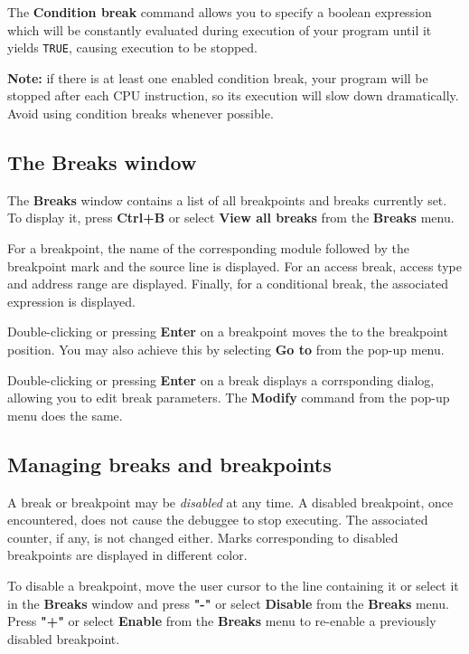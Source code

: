 The {\bf Condition break} command allows you to specify a
boolean expression which will be constantly evaluated during
execution of your program until it yields \verb'TRUE', causing
execution to be stopped.

{\bf Note:} if there is at least one enabled condition break, your program
will be stopped after each CPU instruction, so its execution will slow
down dramatically. Avoid using condition breaks whenever possible.

\subsection{The Breaks window}
\label{dialog:breaks:window}

The {\bf Breaks} window contains a list of all breakpoints and breaks
currently set. To display it, press {\bf Ctrl+B} or select
{\bf View all breaks} from the {\bf Breaks} menu.

For a breakpoint, the name of the corresponding module
followed by the breakpoint mark and the source line is displayed.
For an access break, access type and address range are displayed.
Finally, for a conditional break, the associated expression is displayed.

Double-clicking or pressing {\bf Enter} on a breakpoint moves
the  to the
breakpoint position. You may also achieve this by selecting {\bf Go to}
from the pop-up menu.

Double-clicking or pressing {\bf Enter} on a break displays a
corrsponding dialog, allowing you to edit break parameters.
The {\bf Modify} command from the pop-up menu does the same.

\subsection{Managing breaks and breakpoints}
\label{dialog:breaks:manage}

A break or breakpoint may be {\it disabled} at any time.
A disabled breakpoint, once encountered, does not cause
the debuggee to stop executing. The associated counter, if any,
is not changed either. Marks corresponding to disabled breakpoints
are displayed in different color.

To disable a breakpoint, move the user cursor to the line
containing it or select it in the {\bf Breaks} window
and press {\bf "-"} or select {\bf Disable} from the {\bf Breaks} menu.
Press {\bf "+"} or select {\bf Enable} from the {\bf Breaks} menu to
re-enable a previously disabled breakpoint.

